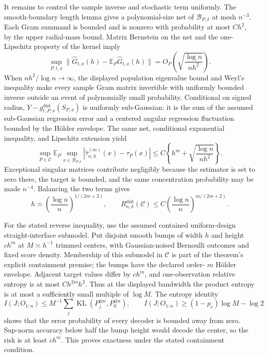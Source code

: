 It remains to control the sample inverse and stochastic term uniformly.  The smooth-boundary length lemma gives a polynomial-size net of \(\mathcal B_{P,\delta}\) at mesh \(n^{-3}\).  Each Gram summand is bounded and is nonzero with probability at most \(Ch^2\), by the upper radial-mass bound.  Matrix Bernstein on the net and the one-Lipschitz property of the kernel imply
\[
\sup_{P,t,x}\lVert\widehat G_{t,x}(h)-\mathbb E_P\widehat G_{t,x}(h)\rVert
=O_P\!\left(\sqrt{\frac{\log n}{nh^2}}\right).
\]
When \(nh^2/\log n\to\infty\), the displayed population eigenvalue bound and Weyl's inequality make every sample Gram matrix invertible with uniformly bounded inverse outside an event of polynomially small probability.  Conditional on signed radius, \(Y-g^{\mathrm{dist}}_{t,P,x}(S_{P,x})\) is uniformly sub-Gaussian: it is the sum of the assumed sub-Gaussian regression error and a centered angular regression fluctuation bounded by the H\"older envelope.  The same net, conditional exponential inequality, and Lipschitz extension yield
\[
\sup_{P\in\mathcal C}\mathbb E_P\sup_{x\in\mathcal B_{P,\delta}}
|\widehat\tau^{(m)}_{n,h}(x)-\tau_P(x)|
\leq C\left\{h^m+\sqrt{\frac{\log n}{nh^2}}\right\}.
\]
Exceptional singular matrices contribute negligibly because the estimator is set to zero there, the target is bounded, and the same concentration probability may be made \(n^{-4}\).  Balancing the two terms gives
\[
h\asymp\left(\frac{\log n}{n}\right)^{1/(2m+2)},
\qquad
R_{n,\delta}^{\mathrm{dist}}(\mathcal C)
\leq C\left(\frac{\log n}{n}\right)^{m/(2m+2)}.
\]

For the stated reverse inequality, use the assumed contained uniform-design straight-interface submodel.  Put disjoint smooth bumps of width \(h\) and height \(c h^m\) at \(M\asymp h^{-1}\) trimmed centers, with Gaussian-noised Bernoulli outcomes and fixed score density.  Membership of this submodel in \(\mathcal C\) is part of the theorem's explicit containment premise; the bumps have the declared order-
\(m\) H\"older envelope.  Adjacent target values differ by \(ch^m\), and one-observation relative entropy is at most \(C h^{2m}h^2\).  Thus at the displayed bandwidth the product entropy is at most a sufficiently small multiple of \(\log M\).  The entropy identity
\[
I(J;O_{1:n})\leq M^{-1}\sum_j\operatorname{KL}(P_j^{\otimes n},P_0^{\otimes n}),
\qquad
I(J;O_{1:n})\geq(1-p_e)\log M-\log2
\]
shows that the error probability of every decoder is bounded away from zero.  Sup-norm accuracy below half the bump height would decode the center, so the risk is at least \(ch^m\).  This proves exactness under the stated containment condition.

